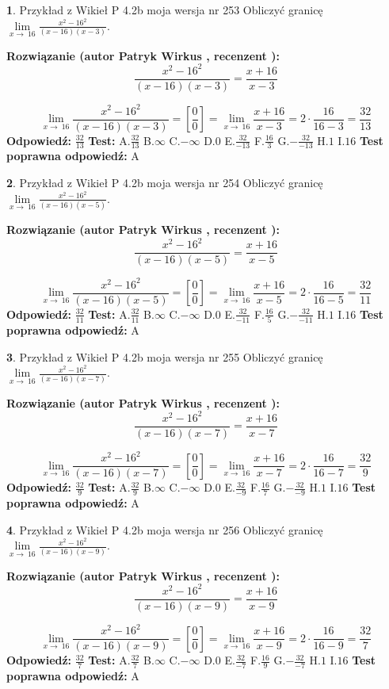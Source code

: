\documentclass[12pt, a4paper]{article}
\theoremstyle{definition} %
\newtheorem{zad}{}
\newcommand{\zadStart}[1]{\begin{zad}#1\newline}
\newcommand{\zadStop}{\end{zad}}
\newcommand{\rozwStart}[2]{\noindent \textbf{Rozwiązanie (autor #1 , recenzent #2): }\newline}
\newcommand{\rozwStop}{\newline}
\newcommand{\odpStart}{\noindent \textbf{Odpowiedź:}\newline}
\newcommand{\odpStop}{\newline}
\newcommand{\testStart}{\noindent \textbf{Test:}\newline}
\newcommand{\testStop}{\newline}
\newcommand{\kluczStart}{\noindent \textbf{Test poprawna odpowiedź:}\newline}
\newcommand{\kluczStop}{\newline}
\begin{document}
\zadStart{Przykład z Wikieł P 4.2b moja wersja nr 253}
Obliczyć granicę $\lim\limits_{x\to\ 16}\frac{x^{2}-16^{2}}{(x-16)(x-3)}$.
\zadStop
\rozwStart{Patryk Wirkus}{}
$$\frac{x^{2}-16^{2}}{(x-16)(x-3)}=\frac{x+16}{x-3}$$

$$\lim\limits_{x\to\ 16}\frac{x^{2}-16^{2}}{(x-16)(x-3)}=[\frac{0}{0}]=\lim\limits_{x\to\ 16}\frac{x+16}{x-3}=2 \cdot \frac{16}{16-3} = \frac{32}{13}$$
\rozwStop
\odpStart
$\frac{32}{13}$
\odpStop
\testStart
A.$\frac{32}{13}$
B.$\infty$
C.$-\infty$
D.$0$
E.$\frac{32}{-13}$
F.$\frac{16}{3}$
G.$-\frac{32}{-13}$
H.$1$
I.$16$
\testStop
\kluczStart
A
\kluczStop



\zadStart{Przykład z Wikieł P 4.2b moja wersja nr 254}
Obliczyć granicę $\lim\limits_{x\to\ 16}\frac{x^{2}-16^{2}}{(x-16)(x-5)}$.
\zadStop
\rozwStart{Patryk Wirkus}{}
$$\frac{x^{2}-16^{2}}{(x-16)(x-5)}=\frac{x+16}{x-5}$$

$$\lim\limits_{x\to\ 16}\frac{x^{2}-16^{2}}{(x-16)(x-5)}=[\frac{0}{0}]=\lim\limits_{x\to\ 16}\frac{x+16}{x-5}=2 \cdot \frac{16}{16-5} = \frac{32}{11}$$
\rozwStop
\odpStart
$\frac{32}{11}$
\odpStop
\testStart
A.$\frac{32}{11}$
B.$\infty$
C.$-\infty$
D.$0$
E.$\frac{32}{-11}$
F.$\frac{16}{5}$
G.$-\frac{32}{-11}$
H.$1$
I.$16$
\testStop
\kluczStart
A
\kluczStop



\zadStart{Przykład z Wikieł P 4.2b moja wersja nr 255}
Obliczyć granicę $\lim\limits_{x\to\ 16}\frac{x^{2}-16^{2}}{(x-16)(x-7)}$.
\zadStop
\rozwStart{Patryk Wirkus}{}
$$\frac{x^{2}-16^{2}}{(x-16)(x-7)}=\frac{x+16}{x-7}$$

$$\lim\limits_{x\to\ 16}\frac{x^{2}-16^{2}}{(x-16)(x-7)}=[\frac{0}{0}]=\lim\limits_{x\to\ 16}\frac{x+16}{x-7}=2 \cdot \frac{16}{16-7} = \frac{32}{9}$$
\rozwStop
\odpStart
$\frac{32}{9}$
\odpStop
\testStart
A.$\frac{32}{9}$
B.$\infty$
C.$-\infty$
D.$0$
E.$\frac{32}{-9}$
F.$\frac{16}{7}$
G.$-\frac{32}{-9}$
H.$1$
I.$16$
\testStop
\kluczStart
A
\kluczStop



\zadStart{Przykład z Wikieł P 4.2b moja wersja nr 256}
Obliczyć granicę $\lim\limits_{x\to\ 16}\frac{x^{2}-16^{2}}{(x-16)(x-9)}$.
\zadStop
\rozwStart{Patryk Wirkus}{}
$$\frac{x^{2}-16^{2}}{(x-16)(x-9)}=\frac{x+16}{x-9}$$

$$\lim\limits_{x\to\ 16}\frac{x^{2}-16^{2}}{(x-16)(x-9)}=[\frac{0}{0}]=\lim\limits_{x\to\ 16}\frac{x+16}{x-9}=2 \cdot \frac{16}{16-9} = \frac{32}{7}$$
\rozwStop
\odpStart
$\frac{32}{7}$
\odpStop
\testStart
A.$\frac{32}{7}$
B.$\infty$
C.$-\infty$
D.$0$
E.$\frac{32}{-7}$
F.$\frac{16}{9}$
G.$-\frac{32}{-7}$
H.$1$
I.$16$
\testStop
\kluczStart
A
\kluczStop
\end{document}
